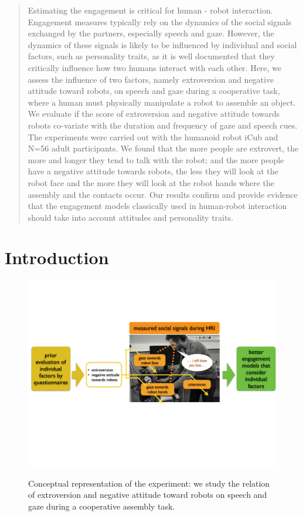 \documentclass[twocolumn]{svjour3}          %
\begin{document}
\begin{abstract}

Estimating the engagement is critical for human - robot interaction. Engagement measures typically rely on the dynamics of the social signals exchanged by the partners, especially speech and gaze. However, the dynamics of these signals is likely to be influenced by individual and social factors, such as personality traits, as it is well documented that they critically influence how two humans interact with each other.
Here, we assess the influence of two factors, namely extroversion and negative attitude toward robots, on speech and gaze during a cooperative task, where a human must physically manipulate a robot to assemble an object. 
We evaluate if the score of extroversion and negative attitude towards robots co-variate with the duration and frequency of gaze and speech cues.
The experiments were carried out with the humanoid robot iCub and N=56 adult participants.
We found that the more people are extrovert, the more and longer they tend to talk with the robot; and the more people have a negative attitude towards robots, the less they will look at the robot face and the more they will look at the robot hands where the assembly and the contacts occur.
Our results confirm and provide evidence that the engagement models classically used in human-robot interaction should take into account attitudes and personality traits.

\end{abstract}




\section{Introduction}

\begin{figure}[t]
\centering
{
\includegraphics[width=0.8\hsize]{figures/conceptual6.pdf}
}
\caption{Conceptual representation of the experiment: we study the relation of extroversion and negative attitude toward robots on speech and gaze during a cooperative assembly task.}
\label{fig:concept}
\end{figure}
\end{document}
